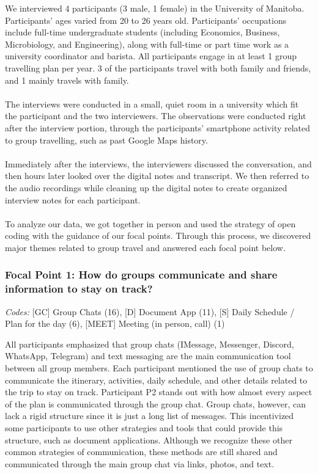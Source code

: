 \documentclass[12pt,a4paper]{article}
\begin{document}
\indent We interviewed 4 participants (3 male, 1 female) in the University of Manitoba. Participants’ ages varied from 20 to 26 years old. Participants’ occupations include full-time undergraduate students (including Economics, Business, Microbiology, and Engineering), along with full-time or part time work as a university coordinator and barista. All participants engage in at least 1 group travelling plan per year. 3 of the participants travel with both family and friends, and 1 mainly travels with family.
\\\\
\indent The interviews were conducted in a small, quiet room in a university which fit the participant and the two interviewers. The observations were conducted right after the interview portion, through the participants’ smartphone activity related to group travelling, such as past Google Maps history.
\\\\
\indent Immediately after the interviews, the interviewers discussed the conversation, and then hours later looked over the digital notes and transcript. We then referred to the audio recordings while cleaning up the digital notes to create organized interview notes for each participant.
\\\\
\indent To analyze our data, we got together in person and used the strategy of open coding with the guidance of our focal points. Through this process, we discovered major themes related to group travel and answered each focal point below.
\\
\subsubsection{Focal Point 1: How do groups communicate and share information to stay on track?}

\textit{Codes:} [GC] Group Chats (16), [D] Document App (11), [S] Daily Schedule / Plan for the day (6), [MEET] Meeting (in person, call) (1)

\vspace{6pt}

All participants emphasized that group chats (IMessage, Messenger, Discord, WhatsApp, Telegram) and text messaging are the main communication tool between all group members. Each participant mentioned the use of group chats to communicate the itinerary, activities, daily schedule, and other details related to the trip to stay on track. Participant P2 stands out with how almost every aspect of the plan is communicated through the group chat. Group chats, however, can lack a rigid structure since it is just a long list of messages. This incentivized some participants to use other strategies and tools that could provide this structure, such as document applications. Although we recognize these other common strategies of communication, these methods are still shared and communicated through the main group chat via links, photos, and text.
\vspace{6pt}
\end{document}
